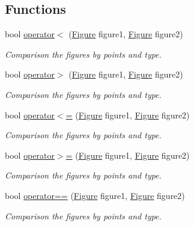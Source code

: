 \subsection*{Functions}
\begin{DoxyCompactItemize}
\item 
bool \mbox{\hyperlink{namespacefop_a848b460556a75362850867d9b567ae59}{operator$<$}} (\mbox{\hyperlink{classfop_1_1_figure}{Figure}} figure1, \mbox{\hyperlink{classfop_1_1_figure}{Figure}} figure2)
\begin{DoxyCompactList}\small\item\em Comparison the figures by points and type. \end{DoxyCompactList}\item 
bool \mbox{\hyperlink{namespacefop_a1e56aa53c205088fdeba5a4ff85b211f}{operator$>$}} (\mbox{\hyperlink{classfop_1_1_figure}{Figure}} figure1, \mbox{\hyperlink{classfop_1_1_figure}{Figure}} figure2)
\begin{DoxyCompactList}\small\item\em Comparison the figures by points and type. \end{DoxyCompactList}\item 
bool \mbox{\hyperlink{namespacefop_a2315668c95e8c527cc00fa12d792542c}{operator$<$=}} (\mbox{\hyperlink{classfop_1_1_figure}{Figure}} figure1, \mbox{\hyperlink{classfop_1_1_figure}{Figure}} figure2)
\begin{DoxyCompactList}\small\item\em Comparison the figures by points and type. \end{DoxyCompactList}\item 
bool \mbox{\hyperlink{namespacefop_a8989439cb0227ca3d76c92a3f515366d}{operator$>$=}} (\mbox{\hyperlink{classfop_1_1_figure}{Figure}} figure1, \mbox{\hyperlink{classfop_1_1_figure}{Figure}} figure2)
\begin{DoxyCompactList}\small\item\em Comparison the figures by points and type. \end{DoxyCompactList}\item 
bool \mbox{\hyperlink{namespacefop_ad4c7032872695a09038ecc2d09fef5b8}{operator==}} (\mbox{\hyperlink{classfop_1_1_figure}{Figure}} figure1, \mbox{\hyperlink{classfop_1_1_figure}{Figure}} figure2)
\begin{DoxyCompactList}\small\item\em Comparison the figures by points and type. \end{DoxyCompactList}\item 

\end{DoxyCompactItemize}
